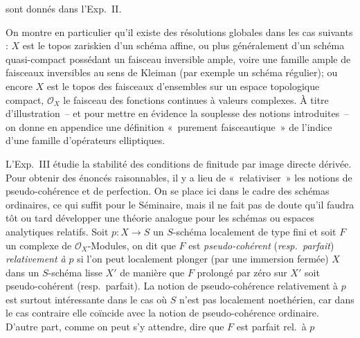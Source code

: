 sont donnés dans l'Exp.\ II.

On montre en particulier qu'il existe des résolutions globales dans les cas suivants : \(X\) est le topos zariskien d'un schéma affine, ou plus généralement d'un schéma quasi-compact possédant un faisceau inversible ample, voire une famille ample de faisceaux inversibles au sens de Kleiman (par exemple un schéma régulier); ou encore \(X\) est le topos des faisceaux d'ensembles sur un espace topologique compact, \(\mathcal O_X\) le faisceau des fonctions continues à valeurs complexes. À titre d'illustration~-- et pour mettre en évidence la souplesse des notions introduites~-- on donne en appendice une définition «~purement faisceautique~» de l'indice d'une famille d'opérateurs elliptiques.

L'Exp.\ III étudie la stabilité des conditions de finitude par image directe dérivée. Pour obtenir des énoncés raisonnables, il y a lieu de «~relativiser~» les notions de pseudo-cohérence et de perfection. On se place ici dans le cadre des schémas ordinaires, ce qui suffit pour le Séminaire, mais il ne fait pas de doute qu'il faudra tôt ou tard développer une théorie analogue pour les schémas ou espaces analytiques relatifs. Soit \(p:X\to S\) un \(S\)-schéma localement de type fini et soit \(F\) un complexe de \(\mathcal O_X\)-Modules, on dit que \(F\) est \emph{pseudo-cohérent} (\emph{resp.\ parfait}) \emph{relativement à} \(p\) si l'on peut localement plonger (par une immersion fermée) \(X\) dans un \(S\)-schéma lisse \(X'\) de manière que \(F\) prolongé par zéro sur \(X'\) soit pseudo-cohérent (resp.\ parfait). La notion de pseudo-cohérence relativement à \(p\) est surtout intéressante dans le cas où \(S\) n'est pas localement noethérien, car dans le cas contraire elle coïncide avec la notion de pseudo-cohérence ordinaire. D'autre part, comme on peut s'y attendre, dire que \(F\) est parfait rel.\ à \(p\)
